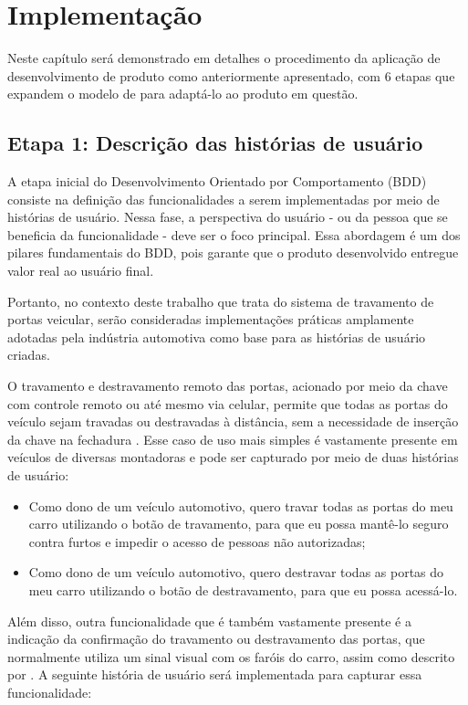 \chapter{Implementação} 
\label{ch:IM}

Neste capítulo será demonstrado em detalhes o procedimento da aplicação de desenvolvimento de produto como anteriormente apresentado, 
com 6 etapas que expandem o modelo de  para adaptá-lo ao produto em questão.

\section{\textbf{Etapa 1: Descrição das histórias de usuário}}
\label{sbs:etapa1}
A etapa inicial do Desenvolvimento Orientado por Comportamento (BDD) consiste na definição das funcionalidades a serem implementadas por meio de histórias de usuário. 
Nessa fase, a perspectiva do usuário - ou da pessoa que se beneficia da funcionalidade - deve ser o foco principal. Essa abordagem é um dos pilares fundamentais do BDD, 
pois garante que o produto desenvolvido entregue valor real ao usuário final.

Portanto, no contexto deste trabalho que trata do sistema de travamento de portas veicular, serão consideradas implementações práticas amplamente adotadas pela 
indústria automotiva como base para as histórias de usuário criadas.

O travamento e destravamento remoto das portas, acionado por meio da chave com controle remoto ou até mesmo via celular, permite que todas as portas do veículo sejam 
travadas ou destravadas à distância, sem a necessidade de inserção da chave na fechadura \cite{bosch2022handbook}. Esse caso de uso mais simples é vastamente presente 
em veículos de diversas montadoras e pode ser capturado por meio de duas histórias de usuário:

\begin{itemize}
    \item Como dono de um veículo automotivo, quero travar todas as portas do meu carro utilizando o botão de travamento, para que eu possa mantê-lo seguro contra furtos e impedir o acesso de pessoas não autorizadas;
    \item Como dono de um veículo automotivo, quero destravar todas as portas do meu carro utilizando o botão de destravamento, para que eu possa acessá-lo.
\end{itemize}

Além disso, outra funcionalidade que é também vastamente presente é a indicação da confirmação do travamento ou destravamento das portas, que normalmente utiliza um 
sinal visual com os faróis do carro, assim como descrito por . A seguinte história de usuário será implementada para capturar essa funcionalidade:

